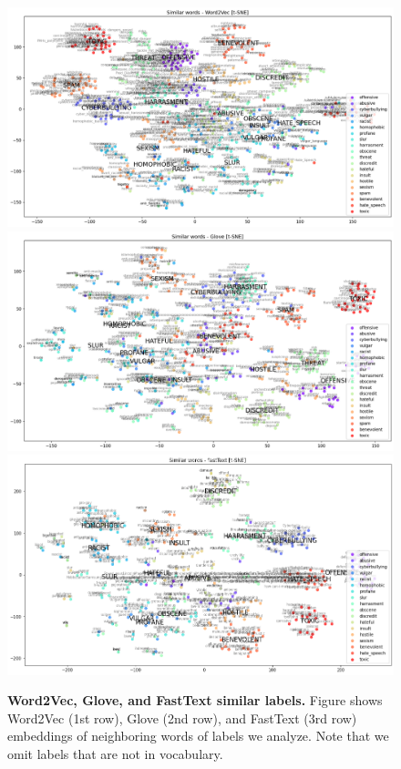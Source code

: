\documentclass[fleqn,moreauthors,10pt]{ds_report}
\begin{document}
\begin{figure}[!t]
	\centering
	\includegraphics[width=\linewidth]{SimilarWords - word2vec - t-SNE_1.png}
	\includegraphics[width=\linewidth]{SimilarWords - Glove - t-SNE_1.png}
	\includegraphics[width=\linewidth]{SimilarWords - FastText - t-SNE_1.png}
	\caption{\textbf{Word2Vec, Glove, and FastText similar labels.} Figure shows Word2Vec (1st row), Glove (2nd row), and FastText (3rd row) embeddings of neighboring words of labels we analyze. Note that we omit labels that are not in vocabulary.}
	\label{fig:embedding_labels}
\end{figure}
\end{document}
